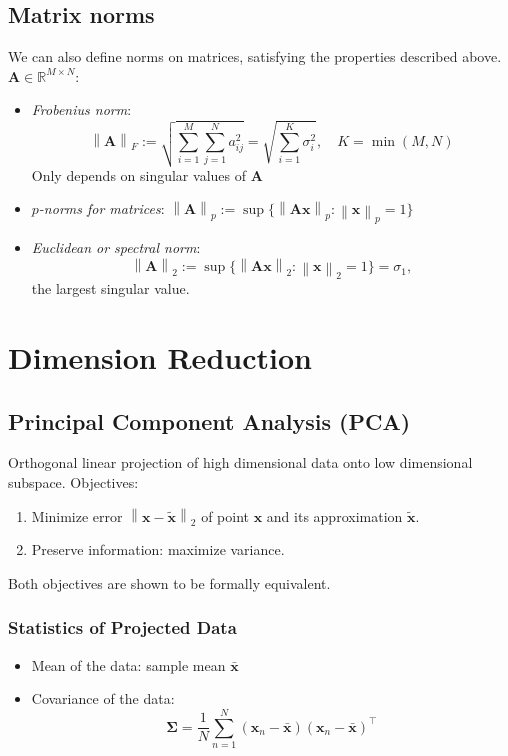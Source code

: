 \documentclass[conference,11pt]{IEEEtran}
\newcommand{\norm}[1]{\left\lVert#1\right\rVert}
\newcommand{\matr}[1]{\boldsymbol{\mathbf{#1}}}
\newcommand{\vect}[1]{\boldsymbol{\mathbf{#1}}}
\newcommand{\trns}[1]{#1^{\top}}
\newcommand{\R}{\mathbb{R}}
\begin{document}
\subsection{Matrix norms}
We can also define norms on matrices, satisfying the properties described
above. $\matr{A} \in \R^{M \times N}$:
\begin{itemize}
  \item \emph{Frobenius norm}:
    \[
      \norm{\matr{A}}_F := \sqrt{\sum_{i=1}^M\sum_{j=1}^N a_{ij}^2}
      = \sqrt{\sum_{i=1}^{K} \sigma_i^2}, \quad K = \min(M,N)
    \]
    Only depends on singular values of $\matr{A}$

  \item \emph{$p$-norms for matrices}:
    \(
      \norm{\matr{A}}_p := \sup\{\norm{\matr{A}\vect{x}}_p :
      \norm{\vect{x}}_p = 1\}
    \)
  \item \emph{Euclidean or spectral norm}:
    \[
      \norm{\matr{A}}_2 := \sup\{\norm{\matr{A}\vect{x}}_2 :
      \norm{\vect{x}}_2 = 1\} = \sigma_1,
    \]
    the largest singular value.

\end{itemize}

\section{Dimension Reduction}
\subsection{Principal Component Analysis (PCA)}
Orthogonal linear projection of high dimensional data onto low
dimensional subspace. Objectives:
\begin{enumerate}
  \item Minimize error $\norm{\vect{x} - \tilde{\vect{x}}}_2$ of
    point $\vect{x}$ and its approximation $\tilde{\vect{x}}$.
  \item Preserve information: maximize variance.
\end{enumerate}
Both objectives are shown to be formally equivalent.
\subsubsection{Statistics of Projected Data}
\begin{itemize}
  \item Mean of the data: sample mean $\bar{\vect{x}}$
  \item Covariance of the data:
    \[
      \matr{\Sigma} = \frac{1}{N} \sum_{n=1}^N (\vect{x}_n -
      \bar{\vect{x}}) \trns{(\vect{x}_n - \bar{\vect{x}})}
    \]
\end{itemize}
\end{document}
